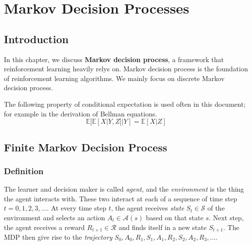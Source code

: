 \documentclass[../../main.tex]{subfiles}
\begin{document}
\chapter{Markov Decision Processes}

\section{Introduction}
    In this chapter, we discuss \textbf{Markov decision process}, a framework that reinforcement learning heavily relys on.
    Markov decision process is the foundation of reinforcement learning algorithms. We mainly focus on discrete Markov decision process.

    The following property of conditional expectation is used often in this document; for example in the derivation of Bellman equations.
    \begin{equation}
        \mathbb{E}[\mathbb{E}[X|Y,Z]|Y]=\mathbb{E}[X|Z] \label{eq:lawOfTotalExpect}
    \end{equation}

\section{Finite Markov Decision Process}
    \subsection{Definition}
        The learner and decision maker is called \emph{agent}, and the \emph{environment} is the thing the agent interacts with.
        These two interact at each of a sequence of time step $t=0,1,2,3,\dots$.
        At every time step $t$, the agent receives \emph{state} $S_t \in \mathcal{S}$ of the environment and selects an action
        $A_t \in \mathcal{A}(s)$ based on that state $s$. Next step, the agent receives a reward $R_{t+1} \in \mathcal{R}$ and finds itself in a new state $S_{t+1}$.
        The MDP then give rise to the \emph{trajectory} $S_0,A_0,R_1,S_1,A_1,R_2,S_2,A_2,R_3,\dots $.
        
\end{document}
